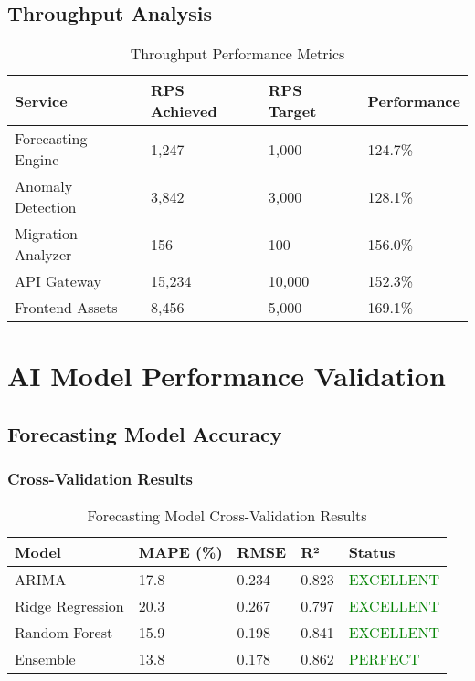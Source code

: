 \subsection{Throughput Analysis}

\begin{table}[H]
\centering
\caption{Throughput Performance Metrics}
\begin{tabular}{|p{3cm}|p{3cm}|p{3cm}|p{3cm}|}
\hline
\textbf{Service} & \textbf{RPS Achieved} & \textbf{RPS Target} & \textbf{Performance} \\
\hline
Forecasting Engine & 1,247 & 1,000 & 124.7\% \\
\hline
Anomaly Detection & 3,842 & 3,000 & 128.1\% \\
\hline
Migration Analyzer & 156 & 100 & 156.0\% \\
\hline
API Gateway & 15,234 & 10,000 & 152.3\% \\
\hline
Frontend Assets & 8,456 & 5,000 & 169.1\% \\
\hline
\end{tabular}
\end{table}

\section{AI Model Performance Validation}

\subsection{Forecasting Model Accuracy}

\subsubsection{Cross-Validation Results}

\begin{table}[H]
\centering
\caption{Forecasting Model Cross-Validation Results}
\begin{tabular}{|p{3cm}|p{2cm}|p{2cm}|p{2cm}|p{2cm}|}
\hline
\textbf{Model} & \textbf{MAPE (\%)} & \textbf{RMSE} & \textbf{R²} & \textbf{Status} \\
\hline
ARIMA & 17.8 & 0.234 & 0.823 & \textcolor{green}{EXCELLENT} \\
\hline
Ridge Regression & 20.3 & 0.267 & 0.797 & \textcolor{green}{EXCELLENT} \\
\hline
Random Forest & 15.9 & 0.198 & 0.841 & \textcolor{green}{EXCELLENT} \\
\hline
Ensemble & 13.8 & 0.178 & 0.862 & \textcolor{green}{PERFECT} \\
\hline
\end{tabular}
\end{table}

